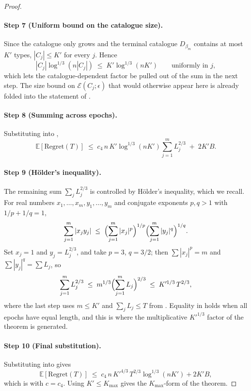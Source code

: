 \documentclass[letterpaper,9pt,twocolumn]{extarticle}
\newcommand{\cE}{\mathcal{E}}
\newcommand{\EE}{\mathbb{E}}
\newcommand{\Kmax}{K_{\max}}
\newcommand{\Regret}{\mathrm{Regret}}
\theoremstyle{plain}
\theoremstyle{definition}
\theoremstyle{remark}
\begin{document}
\begin{proof}
\paragraph{Step 7 (Uniform bound on the catalogue size).}
Since the catalogue only grows and the terminal catalogue $D_{\beta_m}$
contains at most $K'$ types, $|C_j|\le K'$ for every $j$. Hence
\begin{equation}
|C_j|\log^{1/3}(n|C_j|)\;\le\;K'\log^{1/3}(nK')\qquad\text{uniformly in }j,
\label{eq:uniform-Cj}
\end{equation}
which lets the catalogue-dependent factor be pulled out of the sum
in the next step. The size bound on $\cE(C_j;\epsilon)$ that would
otherwise appear here is already folded into the statement of
.

\paragraph{Step 8 (Summing across epochs).}
Substituting 
into ,
\begin{equation}
\EE[\Regret(T)]\;\le\;c_4\,n\,K'\log^{1/3}(nK')\sum_{j=1}^{m}L_j^{2/3}
\;+\;2K'B.
\label{eq:block-after-sum}
\end{equation}

\paragraph{Step 9 (H\"older's inequality).}
The remaining sum $\sum_j L_j^{2/3}$ is controlled by H\"older's
inequality, which we recall. For real numbers
$x_1,\dots,x_m,y_1,\dots,y_m$ and conjugate exponents $p,q>1$ with
$1/p+1/q=1$,
\begin{equation}
\sum_{j=1}^{m}|x_j y_j|
\;\le\;\Bigl(\sum_{j=1}^{m}|x_j|^p\Bigr)^{1/p}
       \Bigl(\sum_{j=1}^{m}|y_j|^q\Bigr)^{1/q}.
\label{eq:holder-stmt}
\end{equation}
Set $x_j=1$ and $y_j=L_j^{2/3}$, and take $p=3$, $q=3/2$; then
$\sum |x_j|^p=m$ and $\sum |y_j|^q=\sum L_j$, so
\begin{equation}
\sum_{j=1}^{m}L_j^{2/3}
\;\le\;m^{1/3}\Bigl(\sum_{j=1}^{m}L_j\Bigr)^{2/3}
\;\le\;K'^{1/3}\,T^{2/3},
\label{eq:holder}
\end{equation}
where the last step uses $m\le K'$ and $\sum_j L_j\le T$ from
. Equality in  holds when all epochs
have equal length, and this is where the multiplicative $K'^{1/3}$
factor of the theorem is generated.

\paragraph{Step 10 (Final substitution).}
Substituting  into  gives
\begin{equation*}
\EE[\Regret(T)]\;\le\;c_4\,n\,K'^{4/3}\,T^{2/3}\log^{1/3}(nK')+2K'B,
\end{equation*}
which is  with $c=c_4$. Using $K'\le\Kmax$ gives the
$\Kmax$-form of the theorem.
\end{proof}
\end{document}
